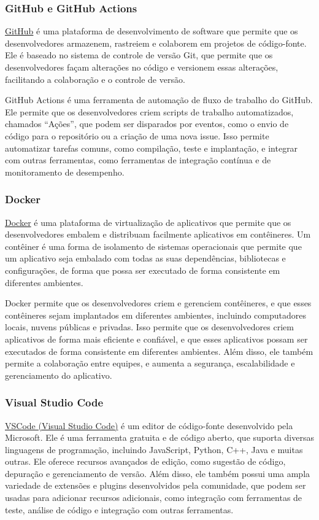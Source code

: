 \subsubsection{GitHub e GitHub Actions}

\href{https://github.com/}{GitHub} é uma plataforma de desenvolvimento de software que permite que os desenvolvedores armazenem, rastreiem e colaborem em projetos de código-fonte. Ele é baseado no sistema de controle de versão Git, que permite que os desenvolvedores façam alterações no código e versionem essas alterações, facilitando a colaboração e o controle de versão.

GitHub Actions é uma ferramenta de automação de fluxo de trabalho do GitHub. Ele permite que os desenvolvedores criem scripts de trabalho automatizados, chamados ``Ações'', que podem ser disparados por eventos, como o envio de código para o repositório ou a criação de uma nova issue. Isso permite automatizar tarefas comuns, como compilação, teste e implantação, e integrar com outras ferramentas, como ferramentas de integração contínua e de monitoramento de desempenho.

\subsubsection{Docker}

\href{https://www.docker.com/}{Docker} é uma plataforma de virtualização de aplicativos que permite que os desenvolvedores embalem e distribuam facilmente aplicativos em contêineres. Um contêiner é uma forma de isolamento de sistemas operacionais que permite que um aplicativo seja embalado com todas as suas dependências, bibliotecas e configurações, de forma que possa ser executado de forma consistente em diferentes ambientes.

Docker permite que os desenvolvedores criem e gerenciem contêineres, e que esses contêineres sejam implantados em diferentes ambientes, incluindo computadores locais, nuvens públicas e privadas. Isso permite que os desenvolvedores criem aplicativos de forma mais eficiente e confiável, e que esses aplicativos possam ser executados de forma consistente em diferentes ambientes. Além disso, ele também permite a colaboração entre equipes, e aumenta a segurança, escalabilidade e gerenciamento do aplicativo.

\subsubsection{Visual Studio Code}

\href{https://code.visualstudio.com/}{VSCode (Visual Studio Code)} é um editor de código-fonte desenvolvido pela Microsoft. Ele é uma ferramenta gratuita e de código aberto, que suporta diversas linguagens de programação, incluindo JavaScript, Python, C++, Java e muitas outras. Ele oferece recursos avançados de edição, como sugestão de código, depuração e gerenciamento de versão. Além disso, ele também possui uma ampla variedade de extensões e plugins desenvolvidos pela comunidade, que podem ser usadas para adicionar recursos adicionais, como integração com ferramentas de teste, análise de código e integração com outras ferramentas.
